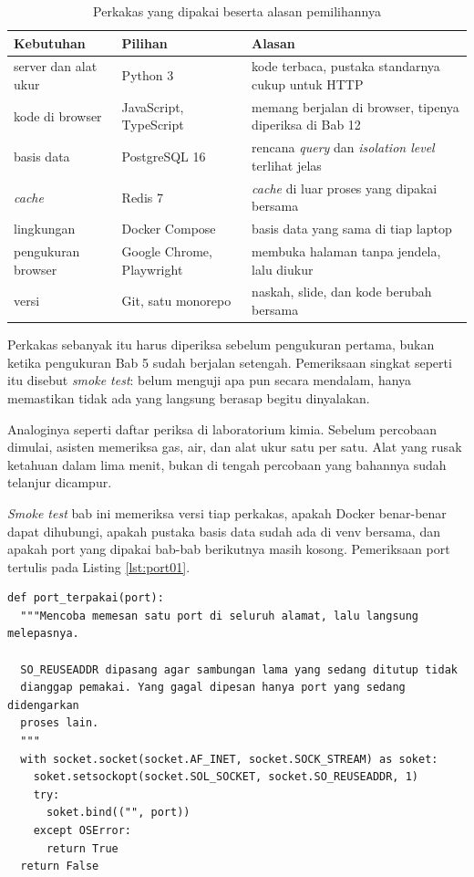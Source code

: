 \begin{table}[!htb]
  \centering
  \caption{Perkakas yang dipakai beserta alasan pemilihannya}
  \label{tab:stack01}
  \begin{tabularx}{\textwidth}{llX}
    \hline
    \textbf{Kebutuhan} & \textbf{Pilihan} & \textbf{Alasan} \\
    \hline
    server dan alat ukur & Python 3 & kode terbaca, pustaka standarnya cukup untuk HTTP \\
    \hline
    kode di browser & JavaScript, TypeScript & memang berjalan di browser, tipenya diperiksa di Bab 12 \\
    \hline
    basis data & PostgreSQL 16 & rencana \textit{query} dan \textit{isolation level} terlihat jelas \\
    \hline
    \textit{cache} & Redis 7 & \textit{cache} di luar proses yang dipakai bersama \\
    \hline
    lingkungan & Docker Compose & basis data yang sama di tiap laptop \\
    \hline
    pengukuran browser & Google Chrome, Playwright & membuka halaman tanpa jendela, lalu diukur \\
    \hline
    versi & Git, satu monorepo & naskah, slide, dan kode berubah bersama \\
    \hline
  \end{tabularx}
\end{table}

Perkakas sebanyak itu harus diperiksa sebelum pengukuran pertama, bukan
ketika pengukuran Bab 5 sudah berjalan setengah. Pemeriksaan singkat seperti itu
disebut \textit{smoke test}: belum menguji apa pun secara mendalam, hanya
memastikan tidak ada yang langsung berasap begitu dinyalakan.

Analoginya seperti daftar periksa di laboratorium kimia. Sebelum percobaan
dimulai, asisten memeriksa gas, air, dan alat ukur satu per satu. Alat yang
rusak ketahuan dalam lima menit, bukan di tengah percobaan yang bahannya sudah
telanjur dicampur.

\textit{Smoke test} bab ini memeriksa versi tiap perkakas, apakah Docker
benar-benar dapat dihubungi, apakah pustaka basis data sudah ada di venv
bersama, dan apakah port yang dipakai bab-bab berikutnya masih kosong.
Pemeriksaan port tertulis pada Listing \ref{lst:port01}.

\begin{lstlisting}[style=PythonStyle, caption={Memeriksa satu port tanpa mengirim data, tersedia di \berkas{sources/chapter01/periksa-lingkungan.py}}, label={lst:port01}]
def port_terpakai(port):
  """Mencoba memesan satu port di seluruh alamat, lalu langsung melepasnya.

  SO_REUSEADDR dipasang agar sambungan lama yang sedang ditutup tidak
  dianggap pemakai. Yang gagal dipesan hanya port yang sedang didengarkan
  proses lain.
  """
  with socket.socket(socket.AF_INET, socket.SOCK_STREAM) as soket:
    soket.setsockopt(socket.SOL_SOCKET, socket.SO_REUSEADDR, 1)
    try:
      soket.bind(("", port))
    except OSError:
      return True
  return False
\end{lstlisting}

